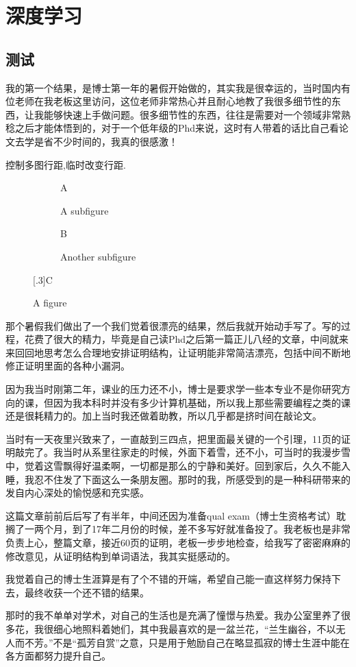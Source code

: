 \chapter{深度学习}

\section{测试}

我的第一个结果，是博士第一年的暑假开始做的，其实我是很幸运的，当时国内有位老师在我老板这里访问，这位老师非常热心并且耐心地教了我很多细节性的东西，让我能够快速上手做问题。很多细节性的东西，往往是需要对一个领域非常熟稔之后才能体悟到的，对于一个低年级的Phd来说，这时有人带着的话比自己看论文去学是省不少时间的，我真的很感激！

控制多图行距,临时改变行距.

\begin{figure}
  \begin{subfigure}[b]{.3\linewidth}
  \centering\large A
  \caption{A subfigure}\label{fig:1a}
  \end{subfigure}%
  \begin{subfigure}[b]{.3\linewidth}
  \centering\large B
  \caption{Another subfigure}\label{fig:1b}
  \end{subfigure} \quad
  [.3\linewidth]{\centering\large C}
  \caption{A figure}\label{fig:1}
\end{figure}


那个暑假我们做出了一个我们觉着很漂亮的结果，然后我就开始动手写了。写的过程，花费了很大的精力，毕竟是自己读Phd之后第一篇正儿八经的文章，中间就来来回回地思考怎么合理地安排证明结构，让证明能非常简洁漂亮，包括中间不断地修正证明里面的各种小漏洞。

因为我当时刚第二年，课业的压力还不小，博士是要求学一些本专业不是你研究方向的课，但因为我本科时并没有多少计算机基础，所以我上那些需要编程之类的课还是很耗精力的。加上当时我还做着助教，所以几乎都是挤时间在敲论文。

当时有一天夜里兴致来了，一直敲到三四点，把里面最关键的一个引理，11页的证明敲完了。我当时从系里往家走的时候，外面下着雪，还不小，可当时的我漫步雪中，觉着这雪飘得好温柔啊，一切都是那么的宁静和美好。回到家后，久久不能入睡，我忍不住发了下面这么一条朋友圈。那时的我，所感受到的是一种科研带来的发自内心深处的愉悦感和充实感。

这篇文章前前后后写了有半年，中间还因为准备qual exam（博士生资格考试）耽搁了一两个月，到了17年二月份的时候，差不多写好就准备投了。我老板也是非常负责上心，整篇文章，接近60页的证明，老板一步步地检查，给我写了密密麻麻的修改意见，从证明结构到单词语法，我其实挺感动的。

我觉着自己的博士生涯算是有了个不错的开端，希望自己能一直这样努力保持下去，最终收获一个还不错的结果。

那时的我不单单对学术，对自己的生活也是充满了憧憬与热爱。我办公室里养了很多花，我很细心地照料着她们，其中我最喜欢的是一盆兰花，“兰生幽谷，不以无人而不芳。”不是“孤芳自赏”之意，只是用于勉励自己在略显孤寂的博士生涯中能在各方面都努力提升自己。
